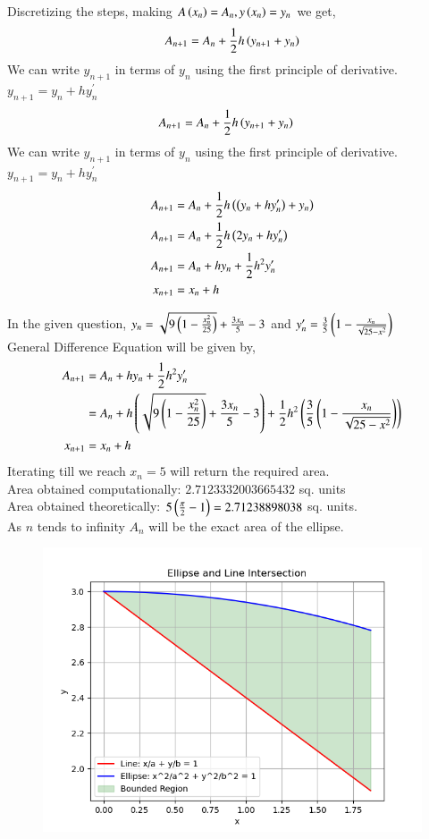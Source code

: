 \documentclass[journal]{IEEEtran}
\begin{document}
Discretizing the steps, making $A\left(x_n\right)=A_n, y\left(x_n\right)=y_n$ we get,
\begin{align}
 A_{n+1}=A_n+\frac{1}{2}h\left(y_{n+1}+y_n\right)
\end{align}
We can write $y_{n+1}$ in terms of $y_n$ using the first principle of derivative. $y_{n+1}=y_n+hy^{\prime}_n$
\begin{align}
  A_{n+1}&=A_n+\frac{1}{2}h\left(y_{n+1}+y_n\right)
\end{align}
We can write $y_{n+1}$ in terms of $y_n$ using the first principle of derivative. $y_{n+1}=y_n+hy^{\prime}_n$
\begin{align}
  A_{n+1}&=A_n+\frac{1}{2}h\left(\left(y_n+hy^{\prime}_n\right)+y_n\right)\\
  A_{n+1}&=A_n+\frac{1}{2}h\left(2y_n+hy^{\prime}_n\right)\\
  A_{n+1}&=A_n+hy_n+\frac{1}{2}h^2y^{\prime}_n\\
  x_{n+1}&=x_n+h
\end{align}

In the given question, $y_n=\sqrt{9\left(1-\frac{x_n^2}{25}\right)}+\frac{3x_n}{5}-3$ and $y^{\prime}_n=\frac{3}{5}\left(1-\frac{x_n}{\sqrt{25-x^2}}\right)$\\
General Difference Equation will be given by,
\begin{align}
  A_{n+1}&=A_n+hy_n+\frac{1}{2}h^2y^{\prime}_n\\
  &=A_n+h\left(\sqrt{9\left(1-\frac{x_n^2}{25}\right)}+\frac{3x_n}{5}-3\right)+\frac{1}{2}h^2\left(\frac{3}{5}\left(1-\frac{x_n}{\sqrt{25-x^2}}\right)\right)\\
  x_{n+1}&=x_n+h
\end{align}
Iterating till we reach $x_n=5$ will return the required area.\\
Area obtained computationally: $2.7123332003665432$ sq. units\\
Area obtained theoretically: $5\left(\frac{\pi}{2}-1\right)=2.71238898038$ sq. units.\\
As $n$ tends to infinity $A_n$ will be the exact area of the ellipse.
\begin{figure}[h!]
   \centering
   \includegraphics[width=1\linewidth]{figs/fig.png}
   
   \label{stemplot}
\end{figure}
\end{document}
